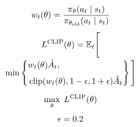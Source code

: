 \documentclass[border=8pt,12pt]{standalone}
\begin{document}
\color{ink}
$\displaystyle \begin{gathered}
w_t(\theta)=\frac{\pi_\theta(a_t\mid s_t)}{\pi_{\theta_{\rm old}}(a_t\mid s_t)}\\[4pt]
L^{\rm CLIP}(\theta)=\mathbb E_t\Bigg[\\[-2pt]
\min\left\{\begin{aligned}
&w_t(\theta)\hat A_t,\\[2pt]
&\operatorname{clip}(w_t(\theta),1-\epsilon,1+\epsilon)\hat A_t
\end{aligned}\right\}\Bigg]\\[5pt]
\max_\theta\;L^{\rm CLIP}(\theta)\\[3pt]
\epsilon=0.2
\end{gathered}$
\end{document}
